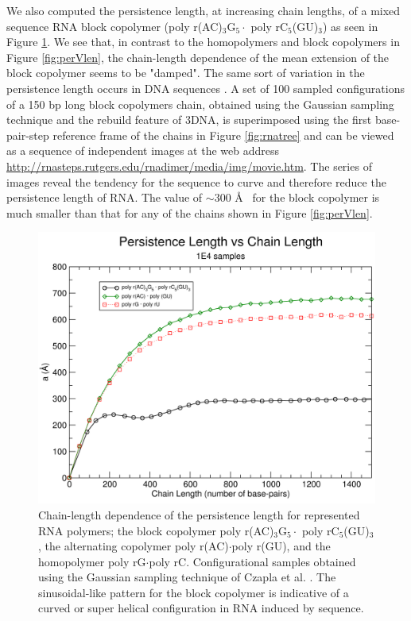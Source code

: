 We also computed the  persistence length, at increasing chain lengths,
of     a    mixed     sequence    RNA     block     copolymer    (poly
r(AC)$_{\text{3}}$G$_{\text{5}}  \cdot$  poly  rC$_{5}$(GU)$_{3}$)  as
seen  in Figure  \ref{fig:curved}.  We  see that,  in contrast  to the
homopolymers  and block  copolymers in  Figure  \ref{fig:perVlen}, the
chain-length dependence  of the mean extension of  the block copolymer
seems to be  "damped".  The same sort of  variation in the persistence
length  occurs in  DNA  sequences \cite{maroun1988b}.   A  set of  100
sampled  configurations  of a  150  bp  long  block copolymers  chain,
obtained using the Gaussian sampling technique and the rebuild feature
of  3DNA, is  superimposed  using the  first base-pair-step  reference
frame of the chains in Figure \ref{fig:rnatree} and can be viewed as a
sequence    of    independent    images    at    the    web    address
\url{http://rnasteps.rutgers.edu/rnadimer/media/img/movie.htm}.     The
series of  images reveal  the tendency for  the sequence to  curve and
therefore reduce the persistence length of RNA. The value of $\sim$300
\AA~ for the block copolymer is  much smaller than that for any of the
chains shown in Figure \ref{fig:perVlen}.

\begin{figure}
\centering
\includegraphics[angle=0, scale=0.60]{Chapter4/curved_and_steps.png}
\caption{Chain-length  dependence   of  the  persistence   length  for
  represented    RNA    polymers;    the    block    copolymer    poly
  r(AC)$_{\text{3}}$G$_{\text{5}}\cdot$                            poly
  rC$_{\text{5}}$(GU)$_{\text{3}}$,  the  alternating  copolymer  poly
  r(AC)$\cdot$poly r(GU),  and the homopolymer  poly rG$\cdot$poly rC.
  Configurational  samples   obtained  using  the   Gaussian  sampling
  technique of  Czapla et al.   \cite{czapla2006}. The sinusoidal-like
  pattern for the  block copolymer is indicative of  a curved or super
  helical configuration in RNA induced by sequence.}
\label{fig:curved}
\end{figure}

